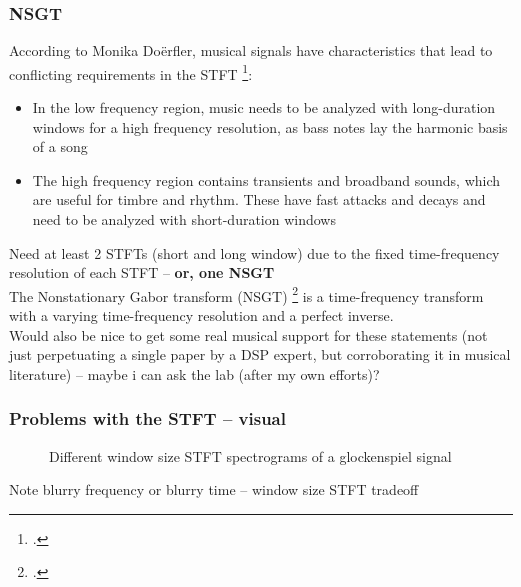 \documentclass[usenames,dvipsnames]{beamer}
\begin{document}
\begin{frame}
	\frametitle{NSGT}
	According to Monika Do{\"e}rfler, musical signals have characteristics that lead to conflicting requirements in the STFT \footcite{doerflerphd}:
	\begin{itemize}
		\item
			In the low frequency region, music needs to be analyzed with long-duration windows for a high frequency resolution, as bass notes lay the harmonic basis of a song
		\item
			The high frequency region contains transients and broadband sounds, which are useful for timbre and rhythm. These have fast attacks and decays and need to be analyzed with short-duration windows
	\end{itemize}
	Need at least 2 STFTs (short and long window) due to the fixed time-frequency resolution of each STFT -- \textbf{or, one NSGT}\\
	The Nonstationary Gabor transform (NSGT) \footcite{balazs} is a time-frequency transform with a varying time-frequency resolution and a perfect inverse.\\
	Would also be nice to get some real musical support for these statements (not just perpetuating a single paper by a DSP expert, but corroborating it in musical literature) -- maybe i can ask the lab (after my own efforts)?
\end{frame}

\begin{frame}
	\frametitle{Problems with the STFT -- visual}
	\begin{figure}[ht]
		\centering
		\hspace{0.5em}
		\caption{Different window size STFT spectrograms of a glockenspiel signal}
		\label{fig:stfttradeoff}
	\end{figure}
	Note blurry frequency or blurry time -- window size STFT tradeoff
\end{frame}
\end{document}
